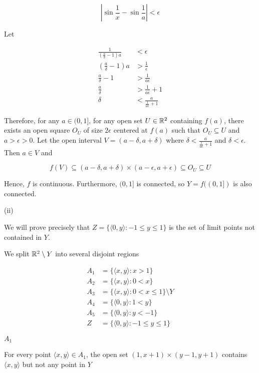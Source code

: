 \documentclass{article}
\begin{document}
$$
    \left|\sin \frac{1}{x} - \sin \frac{1}{a} \right| < \epsilon
$$
    
Let 

\begin{align*}
    \frac{1}{(\frac{a}{\delta} - 1)a} &< \epsilon \\
    (\frac{a}{\delta} - 1)a &> \frac{1}{\epsilon} \\
    \frac{a}{\delta} - 1 &> \frac{1}{a\epsilon} \\
    \frac{a}{\delta} &> \frac{1}{a\epsilon} + 1 \\
    \delta &< \frac{a}{\frac{1}{a\epsilon} + 1}
\end{align*}

Therefore, for any $a \in (0, 1]$, for any open set $U \in \mathbb{R}^2$ containing $f(a)$, there exists an open square $O_U$ of size $2\epsilon$ centered at $f(a)$ such that $O_U \subseteq U$ and $a > \epsilon > 0$. Let the open interval $V = (a - \delta, a + \delta)$ where $\delta < \frac{a}{\frac{1}{a\epsilon} + 1}$ and $\delta < \epsilon$. Then $a \in V$ and

$$
    f(V) \subseteq (a - \delta, a + \delta) \times (a - \epsilon, a + \epsilon) \subseteq O_U \subseteq U
$$

Hence, $f$ is continuous. Furthermore, $(0, 1]$ is connected, so $Y = f((0, 1])$ is also connected.

(ii)

We will prove precisely that $Z = \{ \langle 0, y \rangle: -1 \leq y \leq 1\}$ is the set of limit points not contained in $Y$.

We split $\mathbb{R}^2 \setminus Y$ into several disjoint regions

\begin{align*}
    A_1 &= \{ \langle x, y \rangle: x > 1\} \\
    A_2 &= \{ \langle x, y \rangle: 0 < x\} \\
    A_3 &= \{ \langle x, y \rangle: 0 < x \leq 1\} \setminus Y \\
    A_4 &= \{ \langle 0, y \rangle: 1 < y \} \\
    A_5 &= \{ \langle 0, y \rangle: y < -1 \} \\
    Z   &= \{ \langle 0, y \rangle: -1 \leq y \leq 1\}
\end{align*}

$A_1$

For every point $\langle x, y \rangle \in A_1$, the open set $(1, x+1) \times (y-1, y+1)$ contains $\langle x, y \rangle$ but not any point in $Y$
\end{document}
